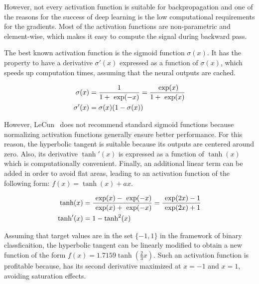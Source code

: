         However, not every activation function is suitable for backpropagation and one of the reasons for the success of deep learning is the low
        computational requirements for the gradients. Most of the activation functions are non-parametric and element-wise, which makes it easy
        to compute the signal during backward pass.

        The best known activation function is the sigmoid function $\sigma(x)$.
        It has the property to have a derivative $\sigma'(x)$ expressed as a function of $\sigma(x)$,
        which speeds up computation times, assuming that the neural outputs are cached.

        \begin{equation}
            \begin{split}
                \sigma(x) & = \frac{1}{1 + \text{ exp}(-x)} = \frac{\text{ exp}(x)}{1 + \text{ exp}(x)} \\
                \sigma'(x) & = \sigma(x) (1 - \sigma(x))
            \end{split}
        \end{equation}

        However, LeCun~\cite{efficientBackprop} does not recommend standard sigmoid functions because normalizing
        activation functions generally ensure better performance.
        For this reason, the hyperbolic tangent is suitable because its outputs are centered around zero.
        Also, its derivative $\tanh'(x)$ is expressed as a function of $\tanh(x)$ which is computationally convenient.
        Finally, an additional linear term can be added in order to
        avoid flat areas, leading to an activation function of the following form: $f(x) = \tanh(x) + ax$.

        \begin{equation}
            \begin{split}
                \tanh(x) & = \frac{\text{ exp}(x) - \text{ exp}(-x)}{\text{ exp}(x) + \text{ exp}(-x)} = \frac{\text{ exp}(2x) - 1}{\text{ exp}(2x) + 1} \\
                \tanh'(x) & = 1 - \tanh^2(x)
            \end{split}
        \end{equation}

        Assuming that target values are in the set $\{-1, 1\}$ in the framework of binary classficaition,
        the hyperbolic tangent can be linearly modified to obtain a new function of the form $f(x) = 1.7159 \tanh(\frac{2}{3} x)$.
        Such an activation function is profitable because, has its second derivative maximized at $x = -1$ and $x = 1$, avoiding
        saturation effects.

